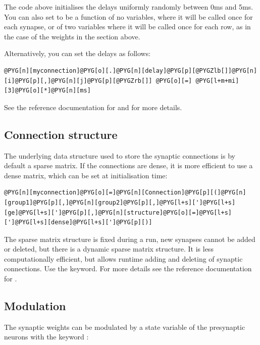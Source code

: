 \documentclass[letterpaper,10pt,english]{manual}
\begin{document}
The code above initialises the delays uniformly randomly between 0ms and 5ms. You can also
set  to be a function of no variables, where it will be called once for each synapse,
or of two variables  where it will be called once for each row, as in the case of the
weights in the section above.

Alternatively, you can set the delays as follows:

\begin{Verbatim}[commandchars=@\[\]]
@PYG[n][myconnection]@PYG[o][.]@PYG[n][delay]@PYG[p][@PYGZlb[]]@PYG[n][i]@PYG[p][,]@PYG[n][j]@PYG[p][@PYGZrb[]] @PYG[o][=] @PYG[l+m+mi][3]@PYG[o][*]@PYG[n][ms]
\end{Verbatim}

See the reference documentation for \hyperlink{brian.Connection}{} and \hyperlink{brian.DelayConnection}{} for
more details.


\subsection{Connection structure}

The underlying data structure used to store the synaptic connections is by default a sparse
matrix. If the connections are dense, it is more efficient to use a dense matrix, which can be
set at initialisation time:

\begin{Verbatim}[commandchars=@\[\]]
@PYG[n][myconnection]@PYG[o][=]@PYG[n][Connection]@PYG[p][(]@PYG[n][group1]@PYG[p][,]@PYG[n][group2]@PYG[p][,]@PYG[l+s][']@PYG[l+s][ge]@PYG[l+s][']@PYG[p][,]@PYG[n][structure]@PYG[o][=]@PYG[l+s][']@PYG[l+s][dense]@PYG[l+s][']@PYG[p][)]
\end{Verbatim}

The sparse matrix structure is fixed during a run, new synapses cannot be added or deleted,
but there is a dynamic sparse matrix structure. It is less computationally efficient, but
allows runtime adding and deleting of synaptic connections. Use the 
keyword. For more details see the reference documentation for \hyperlink{brian.Connection}{}.


\subsection{Modulation}

The synaptic weights can be modulated by a state variable of the presynaptic neurons with
the keyword :
\end{document}
